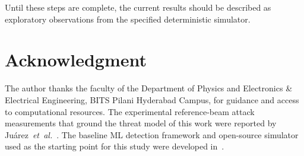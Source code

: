 \documentclass[journal,twocolumn]{IEEEtran}
\begin{document}
Until these steps are complete, the current results should be described as
exploratory observations from the specified deterministic simulator.

\section*{Acknowledgment}

The author thanks the faculty of the Department of Physics and Electronics \&
Electrical Engineering, BITS Pilani Hyderabad Campus, for guidance and access to
computational resources. The experimental reference-beam attack measurements that
ground the threat model of this work were reported by Juárez~\emph{et~al.}~\cite{juarez2026}.
The baseline ML detection framework and open-source simulator used as the starting
point for this study were developed in~\cite{basepaper}.
\end{document}

